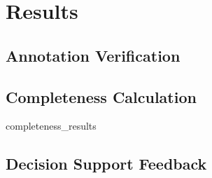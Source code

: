\chapter{Results}

\section{Annotation Verification}

\section{Completeness Calculation}
{completeness_results}

\section{Decision Support Feedback}